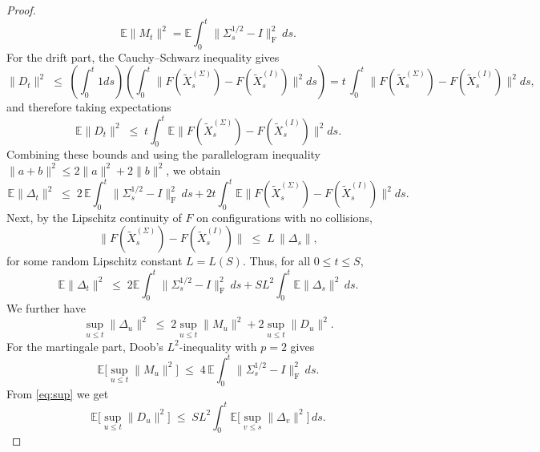 \documentclass[12pt,reqno]{amsart}
\theoremstyle{plain}
\theoremstyle{definition}
\theoremstyle{remark}
\begin{document}
\begin{proof}
\begin{equation}
\mathbb E\|M_t\|^2
= \mathbb E\!\int_0^t \|\Sigma_s^{1/2}-I\|_{\mathrm F}^2\,ds .
\end{equation}
For the drift part, the Cauchy–Schwarz inequality gives
\begin{equation}
\|D_t\|^2
\;\le\; \left ( \int_0^t 1 ds \right ) \left (  \int_0^t \|F(\widetilde X^{(\Sigma)}_s)-F(\widetilde X^{(I)}_s)\|^2 ds \right ) =t \, \int_0^t \|F(\widetilde X^{(\Sigma)}_s)-F(\widetilde X^{(I)}_s)\|^2 ds ,
\end{equation}
and therefore taking expectations 
\begin{equation}
\mathbb E\|D_t\|^2
\;\le\; t \int_0^t \mathbb E\|F(\widetilde X^{(\Sigma)}_s)-F(\widetilde X^{(I)}_s)\|^2 ds .
\end{equation}
Combining these bounds and using
the parallelogram inequality $\|a+b\|^2 \le 2\|a\|^2+2\|b\|^2$, we obtain
\begin{equation}
\mathbb E\|\Delta_t\|^2
\;\le\; 2\,\mathbb E\!\int_0^t \|\Sigma_s^{1/2}-I\|_{\mathrm F}^2\,ds
+ 2t\int_0^t \mathbb E\|F(\widetilde X^{(\Sigma)}_s)-F(\widetilde X^{(I)}_s)\|^2 ds .
\end{equation}
Next, by the Lipschitz continuity of $F$ on configurations with no collisions,
\begin{equation}
\label{eq:sup}
\|F(\widetilde X^{(\Sigma)}_s)-F(\widetilde X^{(I)}_s)\|
\;\le\; L \,\|\Delta_s\|,
\end{equation}
for some random Lipschitz constant $L=L(S)$.  
Thus, for all $0 \leq t \leq S$,
\begin{equation}
\mathbb E\|\Delta_t\|^2
\;\le\;
2 \mathbb E \int_0^t \|\Sigma_s^{1/2}-I\|_{\mathrm F}^2\,ds
+ S L^2 \int_0^t \mathbb E\|\Delta_s\|^2\,ds .
\end{equation}
We further have
\begin{equation}
\sup_{u\le t}\|\Delta_u\|^2 
\;\le\; 2\sup_{u\le t}\|M_u\|^2 + 2\sup_{u\le t}\|D_u\|^2 .
\end{equation}
For the martingale part, Doob’s $L^2$-inequality
with $p=2$ gives 
\begin{equation}\label{eq:bdg-part}
\mathbb E\Big[\sup_{u\le t}\|M_u\|^2\Big]
\;\le\; 4 \,\mathbb E\!\int_0^t \|\Sigma_s^{1/2}-I\|_{\mathrm F}^2\,ds.
\end{equation}
From \eqref{eq:sup} we get 
\begin{equation}
\label{eq:drift-sup}
\mathbb E\Big[\sup_{u\le t}\|D_u\|^2\Big]
\;\le\; S L^2 \int_0^t \mathbb E\Big[\sup_{v\le s}\|\Delta_v\|^2\Big]\,ds.

\end{equation}
\end{proof}
\end{document}
